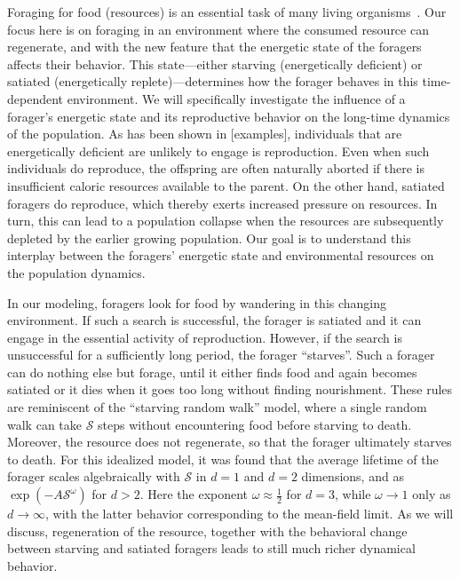 \documentclass[11pt]{article}
\begin{document}
Foraging for food (resources) is an essential task of many living
organisms~\cite{B91,OB90,KM01,ASD97,KR85,SK86,Vea96,LKW88,BLMV11}.  Our focus
here is on foraging in an environment where the consumed resource can
regenerate, and with the new feature that the energetic state of the foragers
affects their behavior.  This state---either starving (energetically
deficient) or satiated (energetically replete)---determines how the forager
behaves in this time-dependent environment.  We will specifically investigate
the influence of a forager's energetic state and its reproductive behavior on
the long-time dynamics of the population.  As has been shown in [examples],
individuals that are energetically deficient are unlikely to engage is
reproduction.  Even when such individuals do reproduce, the offspring are
often naturally aborted if there is insufficient caloric resources available
to the parent.  On the other hand, satiated foragers do reproduce, which
thereby exerts increased pressure on resources.  In turn, this can lead to a
population collapse when the resources are subsequently depleted by the
earlier growing population.  Our goal is to understand this interplay between
the foragers' energetic state and environmental resources on the population
dynamics.

In our modeling, foragers look for food by wandering in this changing
environment.  If such a search is successful, the forager is satiated and it
can engage in the essential activity of reproduction.  However, if the search
is unsuccessful for a sufficiently long period, the forager ``starves''.
Such a forager can do nothing else but forage, until it either finds food and
again becomes satiated or it dies when it goes too long without finding
nourishment.  These rules are reminiscent of the ``starving random walk''
model, where a single random walk can take $\mathcal{S}$ steps without
encountering food before starving to death.  Moreover, the resource does not
regenerate, so that the forager ultimately starves to death.  For this
idealized model, it was found that the average lifetime of the forager scales
algebraically with $\mathcal{S}$ in $d\!=\!1$ and $d\!=\!2$ dimensions, and
as $\exp(-A\mathcal{S}^\omega)$ for $d>2$.  Here the exponent
$\omega\approx \frac{1}{2}$ for $d=3$, while $\omega\to 1$ only as
$d\to \infty$, with the latter behavior corresponding to the mean-field
limit.  As we will discuss, regeneration of the resource, together with the
behavioral change between starving and satiated foragers leads to still much
richer dynamical behavior.
\end{document}
